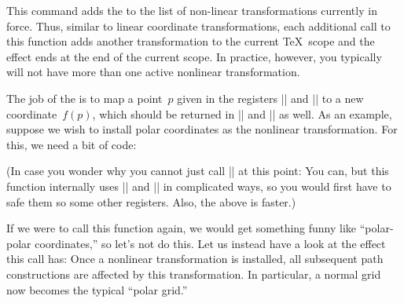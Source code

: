 \begin{command}{\pgftransformnonlinear{}}
  This command adds the  to the list of non-linear
  transformations currently in force. Thus, similar to linear
  coordinate transformations, each additional call to this function
  adds another transformation to the current \TeX\ scope and the
  effect ends at the end of the current scope. In practice, however,
  you typically will not have more than one active nonlinear
  transformation.

  The job of the  is to map a point~$p$
  given in the registers |\pgf@x| and |\pgf@y| to a new
  coordinate~$f(p)$, which should be returned in |\pgf@x| and |\pgf@y|
  as well. As an example, suppose we wish to install polar coordinates
  as the nonlinear transformation. For this, we need a bit of code:
\begin{codeexample}
\def\polartransformation{%
  \pgfmathsincos@{\pgf@sys@tonumber\pgf@x}%
  \pgf@x=\pgfmathresultx\pgf@y%
  \pgf@y=\pgfmathresulty\pgf@y%
}
\end{codeexample}
  (In case you wonder why you cannot just call |\pgfpointpolar| at
  this point: You can, but this function internally uses |\pgf@x|
  and |\pgf@y| in complicated ways, so you would first have to safe
  them so some other registers. Also, the above is faster.)
  
  If we were to call this function again, we would get something funny
  like ``polar-polar coordinates,'' so let's not do this. Let us
  instead have a look at the effect this call has: Once a nonlinear
  transformation is installed, all subsequent path constructions are
  affected by this transformation. In particular, a normal grid now
  becomes the typical ``polar grid.''

\begin{codeexample}[]
\end{codeexample}
\end{command}


